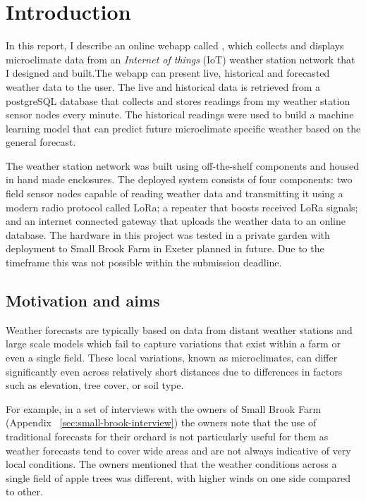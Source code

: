 \section{Introduction}

In this report, I describe an online webapp called \myReportTitle{}, which
collects and displays microclimate data from an \emph{Internet of things} (IoT)
weather station network that I designed and built.The webapp can present live,
historical and forecasted weather data to the user. The live and historical data
is retrieved from a postgreSQL database that collects and stores readings from
my weather station sensor nodes every minute. The historical readings were used
to build a machine learning model that can predict future microclimate specific
weather based on the general forecast.

The weather station network was built using off-the-shelf components and housed
in hand made enclosures. The deployed system consists of four components: two
field sensor nodes capable of reading weather data and transmitting it using a
modern radio protocol called LoRa; a repeater that boosts received LoRa signals;
and an internet connected gateway that uploads the weather data to an online
database. The hardware in this project was tested in a private garden with
deployment to Small Brook Farm in Exeter planned in future. Due to the timeframe
this was not possible within the submission deadline.

\subsection{Motivation and aims}

Weather forecasts are typically based on data from distant weather stations and
large scale models which fail to capture variations that exist within a farm or
even a single field. These local variations, known as microclimates, can differ
significantly even across relatively short distances due to differences in
factors such as elevation, tree cover, or soil type.

For example, in a set of interviews with the owners of Small Brook Farm
(Appendix ~\ref{sec:small-brook-interview}) the owners note that the use of
traditional forecasts for their orchard is not particularly useful for them as
weather forecasts tend to cover wide areas and are not always indicative of very
local conditions. The owners mentioned that the weather conditions across a
single field of apple trees was different, with higher winds on one side
compared to other.

